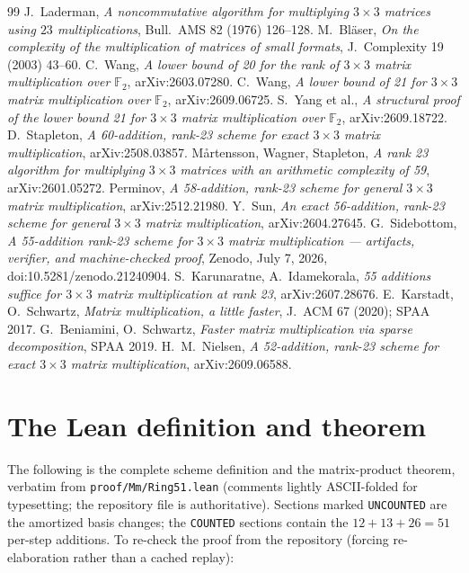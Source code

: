 \documentclass[11pt]{article}
\theoremstyle{definition}
\theoremstyle{remark}
\newcommand{\F}{\mathbb{F}}
\begin{document}
\begin{thebibliography}{99}
 J.~Laderman, \emph{A noncommutative algorithm for
multiplying $3\times3$ matrices using $23$ multiplications}, Bull.\
AMS 82 (1976) 126--128.
 M.~Bl\"aser, \emph{On the complexity of the
multiplication of matrices of small formats}, J.\ Complexity 19
(2003) 43--60.
 C.~Wang, \emph{A lower bound of 20 for the rank of
$3\times3$ matrix multiplication over $\F_2$}, arXiv:2603.07280.
\bibitem{Wang26b} C.~Wang, \emph{A lower bound of 21 for $3\times3$
matrix multiplication over $\F_2$}, arXiv:2609.06725.
 S.~Yang et al., \emph{A structural proof of the
lower bound 21 for $3\times3$ matrix multiplication over $\F_2$},
arXiv:2609.18722.
 D.~Stapleton, \emph{A 60-addition, rank-23
scheme for exact $3\times3$ matrix multiplication}, arXiv:2508.03857.
\bibitem{MWS26} M{\aa}rtensson, Wagner, Stapleton, \emph{A rank 23
algorithm for multiplying $3\times3$ matrices with an arithmetic
complexity of 59}, arXiv:2601.05272.
 Perminov, \emph{A 58-addition, rank-23 scheme for
general $3\times3$ matrix multiplication}, arXiv:2512.21980.
 Y.~Sun, \emph{An exact 56-addition, rank-23 scheme for
general $3\times3$ matrix multiplication}, arXiv:2604.27645.
 G.~Sidebottom, \emph{A 55-addition rank-23
scheme for $3\times3$ matrix multiplication --- artifacts, verifier,
and machine-checked proof}, Zenodo, July 7, 2026,
doi:10.5281/zenodo.21240904.
 S.~Karunaratne, A.~Idamekorala, \emph{55 additions
suffice for $3\times3$ matrix multiplication at rank 23},
arXiv:2607.28676.
 E.~Karstadt, O.~Schwartz, \emph{Matrix multiplication,
a little faster}, J.\ ACM 67 (2020); SPAA 2017.
 G.~Beniamini, O.~Schwartz, \emph{Faster matrix
multiplication via sparse decomposition}, SPAA 2019.
 H.~M.~Nielsen, \emph{A 52-addition, rank-23 scheme
for exact $3\times3$ matrix multiplication}, arXiv:2609.06588.
\end{thebibliography}

\appendix

\section{The Lean definition and theorem}\label{app:lean}

The following is the complete scheme definition and the
matrix-product theorem, verbatim from \texttt{proof/Mm/Ring51.lean}
(comments lightly ASCII-folded for typesetting; the repository file is
authoritative).  Sections marked \texttt{UNCOUNTED} are the amortized
basis changes; the \texttt{COUNTED} sections contain the
$12+13+26=51$ per-step additions.  To re-check the proof from the
repository (forcing re-elaboration rather than a cached replay):
\end{document}
